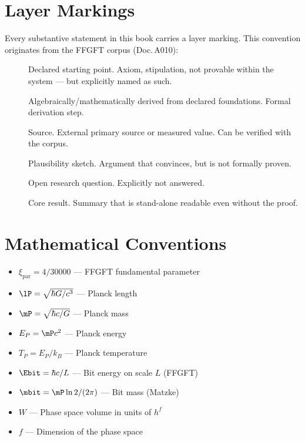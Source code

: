 
\section*{Layer Markings}

Every substantive statement in this book carries a layer marking.
This convention originates from the FFGFT corpus (Doc.\,A010):

\begin{description}
  \item[] Declared starting point. Axiom, stipulation, not provable
    within the system --- but explicitly named as such.
  \item[] Algebraically/mathematically derived from declared foundations.
    Formal derivation step.
  \item[\QQ{}] Source. External primary source or measured value. Can be verified
    with the corpus.
  \item[] Plausibility sketch. Argument that convinces, but is not
    formally proven.
  \item[] Open research question. Explicitly not answered.
  \item[] Core result. Summary that is stand-alone readable even without
    the proof.
\end{description}

\section*{Mathematical Conventions}

\begin{itemize}
  \item $\xi_{\text{par}} = 4/30000$ --- FFGFT fundamental parameter
  \item $\lP = \sqrt{\hbar G/c^3}$ --- Planck length
  \item $\mP = \sqrt{\hbar c/G}$ --- Planck mass
  \item $E_P = \mP c^2$ --- Planck energy
  \item $T_P = E_P / k_B$ --- Planck temperature
  \item $\Ebit = \hbar c / L$ --- Bit energy on scale $L$ (FFGFT)
  \item $\mbit = \mP \ln 2 / (2\pi)$ --- Bit mass (Matzke)
  \item $W$ --- Phase space volume in units of $h^f$
  \item $f$ --- Dimension of the phase space
\end{itemize}

